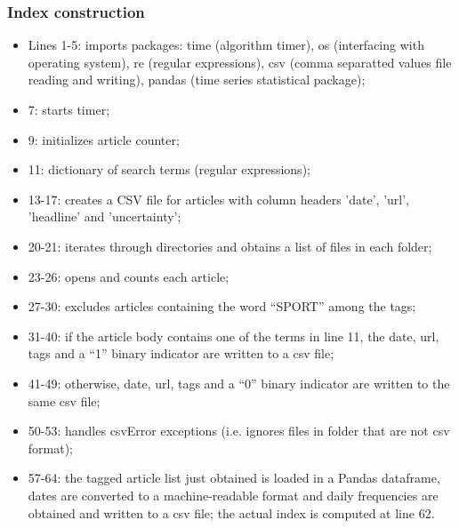 \documentclass[12pt]{article}
\begin{document}
\subsubsection{Index construction}

\begin{itemize}
\item Lines 1-5: imports packages: time (algorithm timer), os (interfacing
with operating system), re (regular expressions), csv (comma separatted
values file reading and writing), pandas (time series statistical package);

\item 7: starts timer;

\item 9: initializes article counter;

\item 11: dictionary of search terms (regular expressions);

\item 13-17: creates a CSV file for articles with column headers 'date',
'url', 'headline' and 'uncertainty';

\item 20-21: iterates through directories and obtains a list of files in
each folder;

\item 23-26: opens and counts each article;

\item 27-30: excludes articles containing the word ``SPORT'' among the tags;

\item 31-40: if the article body contains one of the terms in line 11, the
date, url, tags and a ``1'' binary indicator are written to a csv file;

\item 41-49: otherwise, date, url, tags and a ``0'' binary indicator are
written to the same csv file;

\item 50-53: handles csvError exceptions (i.e. ignores files in folder that
are not csv format);

\item 57-64: the tagged article list just obtained is loaded in a Pandas
dataframe, dates are converted to a machine-readable format and daily
frequencies are obtained and written to a csv file; the actual index is
computed at line 62.
\end{itemize}
\end{document}
